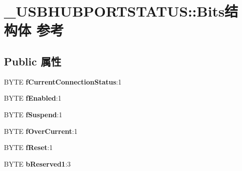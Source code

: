 \hypertarget{struct___u_s_b_h_u_b_p_o_r_t_s_t_a_t_u_s_1_1_bits}{}\section{\+\_\+\+U\+S\+B\+H\+U\+B\+P\+O\+R\+T\+S\+T\+A\+T\+US\+:\+:Bits结构体 参考}
\label{struct___u_s_b_h_u_b_p_o_r_t_s_t_a_t_u_s_1_1_bits}
\subsection*{Public 属性}
\begin{DoxyCompactItemize}
\item 
\mbox{\label{struct___u_s_b_h_u_b_p_o_r_t_s_t_a_t_u_s_1_1_bits_a63a70f68ebb2a5fcb482ea53fbd407b5}} 
B\+Y\+TE {\bfseries f\+Current\+Connection\+Status}\+:1
\item 
\mbox{\label{struct___u_s_b_h_u_b_p_o_r_t_s_t_a_t_u_s_1_1_bits_a1840317e7465be45821eca4152d3bdab}} 
B\+Y\+TE {\bfseries f\+Enabled}\+:1
\item 
\mbox{\label{struct___u_s_b_h_u_b_p_o_r_t_s_t_a_t_u_s_1_1_bits_acca355c8f46e150722636534fd2169df}} 
B\+Y\+TE {\bfseries f\+Suspend}\+:1
\item 
\mbox{\label{struct___u_s_b_h_u_b_p_o_r_t_s_t_a_t_u_s_1_1_bits_a16536861872e17eb1412d49f1354404d}} 
B\+Y\+TE {\bfseries f\+Over\+Current}\+:1
\item 
\mbox{\label{struct___u_s_b_h_u_b_p_o_r_t_s_t_a_t_u_s_1_1_bits_a37dd14005d157f950b7e8cb52fe7e08b}} 
B\+Y\+TE {\bfseries f\+Reset}\+:1
\item 
\mbox{\label{struct___u_s_b_h_u_b_p_o_r_t_s_t_a_t_u_s_1_1_bits_a95266943890a49f1e201b21a708533f9}} 
B\+Y\+TE {\bfseries b\+Reserved1}\+:3
\item 
\mbox{\label{struct___u_s_b_h_u_b_p_o_r_t_s_t_a_t_u_s_1_1_bits_a2306bdf9183fa57d9526747bc92adcf7}} 

\end{DoxyCompactItemize}
